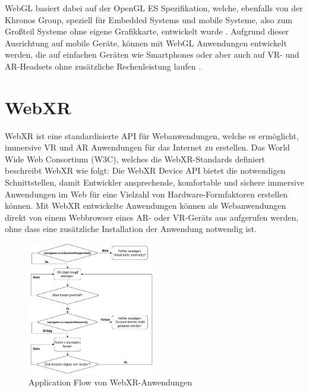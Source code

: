 WebGL basiert dabei auf der OpenGL ES Spezifikation, welche, ebenfalls von der Khronos Group, speziell für Embedded Systems und mobile Systeme, also zum Großteil Systeme ohne eigene Grafikkarte, entwickelt wurde \autocite[]{khronos-opengles}.
Aufgrund dieser Ausrichtung auf mobile Geräte, können mit WebGL Anwendungen entwickelt werden, die auf einfachen Geräten wie Smartphones oder aber auch auf VR- und AR-Headsets ohne zusätzliche Rechenleistung laufen \autocite[][S.3]{Baruah2021}.


\section{WebXR}

WebXR ist eine standardisierte API für Webanwendungen, welche es ermöglicht, immersive VR und AR Anwendungen für das Internet zu erstellen.
Das World Wide Web Consortium (W3C), welches die WebXR-Standards definiert beschreibt WebXR wie folgt: \glqq{}Die WebXR Device API bietet die notwendigen Schnittstellen, damit Entwickler ansprechende, komfortable und sichere immersive Anwendungen im Web für eine Vielzahl von Hardware-Formfaktoren erstellen können.\grqq{} \autocite[aus dem Englischen mit DeepL ][1. Introduction]{w3c_webxr}
Mit WebXR entwickelte Anwendungen können als Webanwendungen direkt von einem Webbrowser eines AR- oder VR-Geräts aus aufgerufen werden, ohne dass eine zusätzliche Installation der Anwendung notwendig ist.

\begin{figure}[H]
    \centering
    \includegraphics[width=0.5\textwidth]{images/WebXR-App-Flow.png}
    \caption{Application Flow von WebXR-Anwendungen}
    \label{fig:webxr-app-flow}
  \end{figure}

